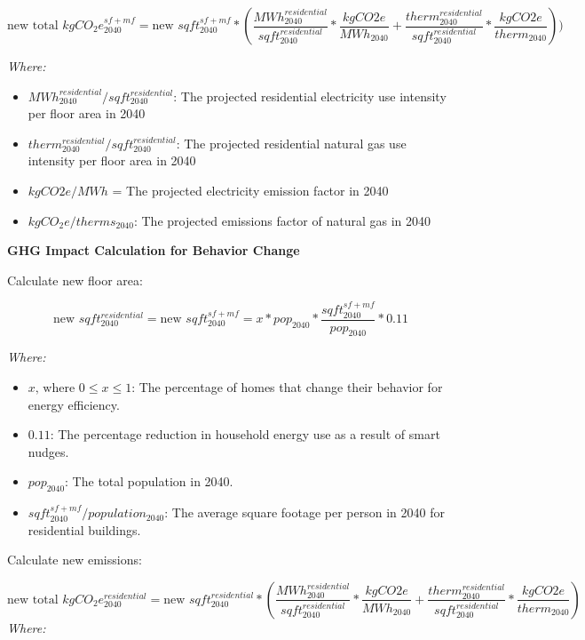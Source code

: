 \documentclass[
]{book}
\providecommand{\tightlist}{%
  \setlength{\itemsep}{0pt}\setlength{\parskip}{0pt}}
\begin{document}
\[\text{new total }kgCO_2e^{sf + mf}_{2040} = \text{new }sqft_{2040}^{sf + mf}  * \left( \frac{MWh_{2040}^{residential}}{sqft_{2040}^{residential}} * \frac{kgCO2e}{MWh_{2040}} + \frac{therm_{2040}^{residential}}{sqft_{2040}^{residential}} * \frac{kgCO2e}{therm_{2040}} \right))\]

\emph{Where:}

\begin{itemize}
\tightlist
\item
  \(MWh_{2040}^{residential}/sqft_{2040}^{residential}\): The projected residential electricity use intensity per floor area in 2040
\item
  \(therm_{2040}^{residential}/sqft_{2040}^{residential}\): The projected residential natural gas use intensity per floor area in 2040
\item
  \(kgCO2e/MWh\) = The projected electricity emission factor in 2040
\item
  \(kgCO_2e/therms_{2040}\): The projected emissions factor of natural gas in 2040
\end{itemize}

\textbf{GHG Impact Calculation for Behavior Change}

Calculate new floor area:

\[ \text{new }sqft_{2040}^{residential} = \text{new }sqft_{2040}^{sf+mf} = x * pop_{2040} * \frac{sqft_{2040}^{sf + mf}}{pop_{2040}} * 0.11 \]

\emph{Where:}

\begin{itemize}
\tightlist
\item
  \(x \text{, where } 0 \le x \le 1\): The percentage of homes that change their behavior for energy efficiency.
\item
  \(0.11\): The percentage reduction in household energy use as a result of smart nudges.
\item
  \(pop_{2040}\): The total population in 2040.
\item
  \(sqft_{2040}^{sf+mf}/population_{2040}\): The average square footage per person in 2040 for residential buildings.
\end{itemize}

Calculate new emissions:

\[\text{new total }kgCO_2e^{residential}_{2040} = \text{new }sqft_{2040}^{residential}* \left( \frac{MWh_{2040}^{residential}}{sqft_{2040}^{residential}} * \frac{kgCO2e}{MWh_{2040}} + \frac{therm_{2040}^{residential}}{sqft_{2040}^{residential}} * \frac{kgCO2e}{therm_{2040}} \right)\]
\emph{Where:}
\end{document}
